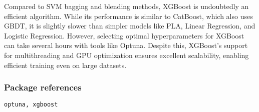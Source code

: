 Compared to SVM bagging and blending methods, XGBoost is undoubtedly an efficient algorithm. 
While its performance is similar to CatBoost, which also uses GBDT, it is slightly slower than simpler models like PLA, Linear Regression, and Logistic Regression. 
However, selecting optimal hyperparameters for XGBoost can take several hours with tools like Optuna. Despite this, XGBoost's support for multithreading and GPU optimization ensures excellent scalability, 
enabling efficient training even on large datasets.
 
\subsubsection*{Package references}
\begin{lstlisting}[language=Python]
optuna, xgboost
\end{lstlisting}

